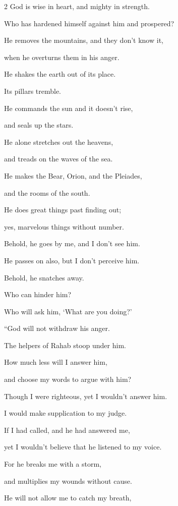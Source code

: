 \begin{multicols}{2}
	\myverse{}God is wise in heart, and mighty in strength.
	
	Who has hardened himself against him and prospered?
	
	\myverse{}He removes the mountains, and they don’t know it,
	
	when he overturns them in his anger.
	
	\myverse{}He shakes the earth out of its place.
	
	Its pillars tremble.
	
	\myverse{}He commands the sun and it doesn’t rise,
	
	and seals up the stars.
	
	\myverse{}He alone stretches out the heavens,
	
	and treads on the waves of the sea.
	
	\myverse{}He makes the Bear, Orion, and the Pleiades,
	
	and the rooms of the south.
	
	\myverse{}He does great things past finding out;
	
	yes, marvelous things without number.
	
	\myverse{}Behold, he goes by me, and I don’t see him.
	
	He passes on also, but I don’t perceive him.
	
	\myverse{}Behold, he snatches away.
	
	Who can hinder him?
	
	Who will ask him, ‘What are you doing?’
	
	\vspace{\baselineskip}
	
	\myverse{}“God will not withdraw his anger.
	
	The helpers of Rahab stoop under him.
	
	\myverse{}How much less will I answer him,
	
	and choose my words to argue with him?
	
	\myverse{}Though I were righteous, yet I wouldn’t answer him.
	
	I would make supplication to my judge.
	
	\myverse{}If I had called, and he had answered me,
	
	yet I wouldn’t believe that he listened to my voice.
	
	\myverse{}For he breaks me with a storm,
	
	and multiplies my wounds without cause.
	
	\myverse{}He will not allow me to catch my breath,
	

\end{multicols}
